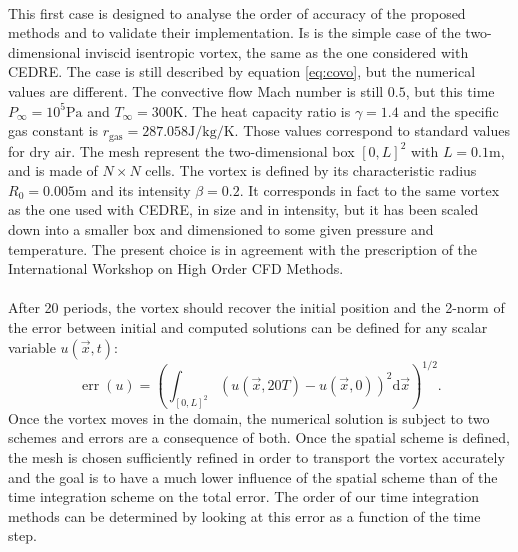       \paragraph{}
      This first case is designed to analyse the order of accuracy of the proposed methods and to validate their implementation.
      Is is the simple case of the two-dimensional inviscid isentropic vortex, the same as the one considered with CEDRE.
      The case is still described by equation \ref{eq:covo}, but the numerical values are different.
      The convective flow Mach number is still $0.5$, but this time $P_\infty = 10^5\si{\pascal}$ and $T_\infty = 300\si{\kelvin}$.
      The heat capacity ratio is $\gamma = 1.4$ and the specific gas constant is $r_\textrm{gas} = 287.058\si{\joule\per\kilo\gram\per\kelvin}$.
      Those values correspond to standard values for dry air.
      The mesh represent the two-dimensional box $\left[0, L\right]^2$ with $L = 0.1\si{\meter}$, and is made of $N \times N$ cells.
      The vortex is defined by its characteristic radius $R_0 = 0.005\si{\meter}$ and its intensity $\beta = 0.2$.
      It corresponds in fact to the same vortex as the one used with CEDRE, in size and in intensity, but it has been scaled down into a smaller box and dimensioned to some given pressure and temperature.
      The present choice is in agreement with the prescription of the International Workshop on High Order CFD Methods.

      \paragraph{}

      \paragraph{}
      After 20 periods, the vortex should recover the initial position and the 2-norm of the error between initial and computed solutions can be defined for any scalar variable $u\left(\vec{x}, t\right)$:
      \begin{equation}
        \operatorname{err}\left(u\right) = \left(\int_{\left[0, L\right]^2} \left(u\left(\vec{x}, 20T\right) - u\left(\vec{x}, 0\right)\right)^2 \mathrm{d}\vec{x} \right)^{1/2} .
      \end{equation}
      Once the vortex moves in the domain, the numerical solution is subject to two schemes and errors are a consequence of both.
      Once the spatial scheme is defined, the mesh is chosen sufficiently refined in order to transport the vortex accurately and the goal is to have a much lower influence of the spatial scheme than of the time integration scheme on the total error.
      The order of our time integration methods can be determined by looking at this error as a function of the time step.

